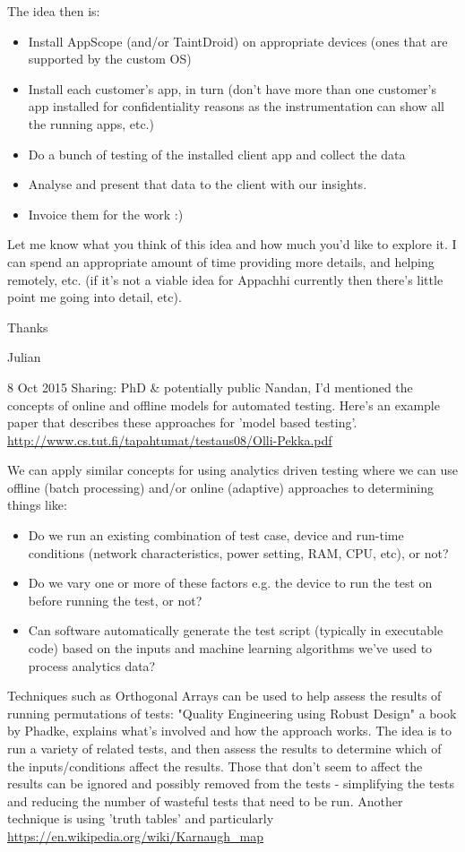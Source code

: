 The idea then is:
\begin{itemize}
    \item Install AppScope (and/or TaintDroid) on appropriate devices (ones that are supported by the custom OS)
    \item Install each customer's app, in turn (don't have more than one customer's app installed for confidentiality reasons as the instrumentation can show all the running apps, etc.)
    \item Do a bunch of testing of the installed client app and collect the data
    \item Analyse and present that data to the client with our insights.
    \item Invoice them for the work :)
\end{itemize}
Let me know what you think of this idea and how much you'd like to explore it. I can spend an appropriate amount of time providing more details, and helping remotely, etc. (if it's not a viable idea for Appachhi currently then there's little point me going into detail, etc).

Thanks

Julian

8 Oct 2015
Sharing: PhD & potentially public
Nandan,
I'd mentioned the concepts of online and offline models for automated testing. Here's an example paper that describes these approaches for 'model based testing'.
\url{http://www.cs.tut.fi/tapahtumat/testaus08/Olli-Pekka.pdf}

We can apply similar concepts for using analytics driven testing where we can use offline (batch processing) and/or online (adaptive) approaches to determining things like:
\begin{itemize}
    \item Do we run an existing combination of test case, device and run-time conditions (network characteristics, power setting, RAM, CPU, etc), or not?
    \item Do we vary one or more of these factors e.g. the device to run the test on before running the test, or not?
    \item Can software automatically generate the test script (typically in executable code) based on the inputs and machine learning algorithms we've used to process analytics data?
\end{itemize}
Techniques such as Orthogonal Arrays can be used to help assess the results of running permutations of tests: "Quality Engineering using Robust Design" a book by Phadke, explains what's involved and how the approach works. The idea is to run a variety of related tests, and then assess the results to determine which of the inputs/conditions affect the results. Those that don't seem to affect the results can be ignored and possibly removed from the tests - simplifying the tests and reducing the number of wasteful tests that need to be run. Another technique is using 'truth tables' and particularly \url{https://en.wikipedia.org/wiki/Karnaugh_map} 

